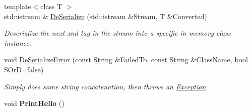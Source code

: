 \begin{DoxyCompactItemize}
{\footnotesize template$<$class T $>$ }\\std::istream \& \hyperlink{namespaceMezzanine_af7841a01c9f5e835029a9c70c0de0de5}{DeSerialize} (std::istream \&Stream, T \&Converted)
\begin{DoxyCompactList}\small\item\em Deserialize the next xml tag in the stream into a specific in memory class instance. \item\end{DoxyCompactList}\item 
void \hyperlink{namespaceMezzanine_aec75a8a3369287cb02f331c62b32df73}{DeSerializeError} (const \hyperlink{namespaceMezzanine_acf9fcc130e6ebf08e3d8491aebcf1c86}{String} \&FailedTo, const \hyperlink{namespaceMezzanine_acf9fcc130e6ebf08e3d8491aebcf1c86}{String} \&ClassName, bool SOrD=false)
\begin{DoxyCompactList}\small\item\em Simply does some string concatenation, then throws an \hyperlink{classMezzanine_1_1Exception}{Exception}. \item\end{DoxyCompactList}\item 
\hypertarget{namespaceMezzanine_a2f11f2ef7129480d902dc4995c3c8633}{
void {\bfseries PrintHello} ()}
\label{namespaceMezzanine_a2f11f2ef7129480d902dc4995c3c8633}


\end{DoxyCompactItemize}
